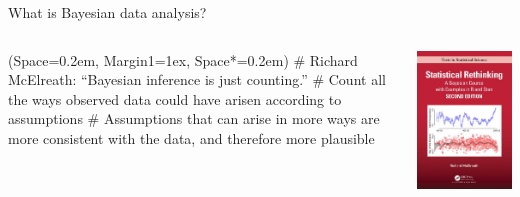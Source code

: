 \documentclass[12pt, aspectratio=149]{beamer}
\newcommand{\listSpace}{0.2em}
\theoremstyle{plain}
\begin{document}
\begin{frame}[fragile]{What is Bayesian data analysis?}
	\begin{columns}
		\begin{column}{0.7\linewidth}
			\begin{easylist}[itemize]
					\ListProperties(Space=\listSpace, Margin1=1ex, Space*=\listSpace)
					# Richard McElreath: ``Bayesian inference is just counting.''  
					# Count all the ways observed data could have arisen according to assumptions
					# Assumptions that can arise in more ways are more consistent with the data, and therefore more plausible
			\end{easylist}
		\end{column}
	\begin{column}{0.3\textwidth}
		\includegraphics[height=0.7\textheight]{figs/rethinking3.jpg}
	\end{column}
	\end{columns}
\end{frame}
\end{document}

